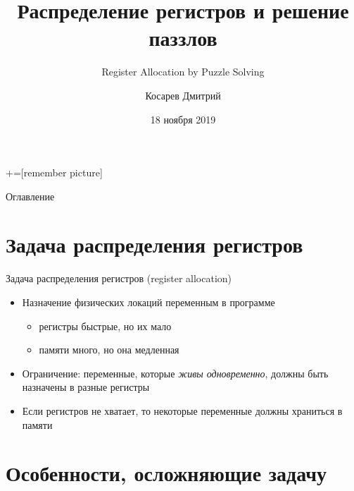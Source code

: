 \documentclass[aspectratio=169
  , xcolor={svgnames}
  , hyperref={ colorlinks,citecolor=DeepPink4
             , linkcolor=DarkRed,urlcolor=DarkBlue}
  , russian
  ]{beamer}
\title[]{Распределение регистров и решение паззлов}
\subtitle{Register Allocation by Puzzle Solving}
\author{Косарев Дмитрий }
\institute{матмех СПбГУ}
\date{18 ноября 2019}
\theoremstyle{exerciseStyle1}
\begin{document}
\maketitle

+=[remember picture] 

\everymath{\displaystyle}

\begin{frame}{Оглавление}
  \tableofcontents[]
\end{frame}

\section{Задача распределения регистров}

\begin{frame}{Задача распределения регистров (register allocation)}
\begin{itemize}
  \item Назначение физических локаций переменным в программе
    \begin{itemize}
      \item регистры быстрые, но их мало
      \item памяти много, но она медленная
    \end{itemize}
  \item Ограничение: переменные, которые \emph{живы одновременно}, должны быть назначены в разные регистры
  \item Если регистров не хватает, то некоторые переменные должны храниться в памяти
\end{itemize}
\end{frame}

\section{Особенности, осложняющие задачу}
\end{document}
